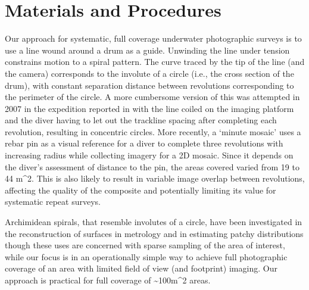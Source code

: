 \section{Materials and Procedures}

Our approach for systematic, full coverage underwater photographic surveys is to use a line wound around a drum as a guide. Unwinding the line under tension constrains motion to a spiral pattern. The curve traced by the tip of the line (and the camera) corresponds to the involute of a circle (i.e., the cross section of the drum), with constant separation distance between revolutions corresponding to the perimeter of the circle. A more cumbersome version of this was attempted in 2007 in the expedition reported in \cite{Camilli_2007} with the line coiled on the imaging platform and the diver having to let out the trackline spacing after completing each revolution, resulting in concentric circles. More recently, a `minute mosaic' \cite{gintert2012third} uses a rebar pin as a visual reference for a diver to complete three revolutions with increasing radius while collecting imagery for a 2D mosaic. Since it depends on the diver's assessment of distance to the pin, the areas covered varied from 19 to 44 m^{2}. This is also likely to result in variable image overlap between revolutions, affecting the quality of the composite and potentially limiting its value for systematic repeat surveys. 

Archimidean spirals, that resemble involutes of a circle, have been investigated in the reconstruction of surfaces in metrology \cite{Wieczorowski_2001} and in estimating patchy distributions \cite{Kalikhman_2006} though these uses are concerned with sparse sampling of the area of interest, while our focus is in an operationally simple way to achieve full photographic coverage of an area with limited field of view (and footprint) imaging. Our approach is practical for full coverage of \sim{100m^{2}} areas.

